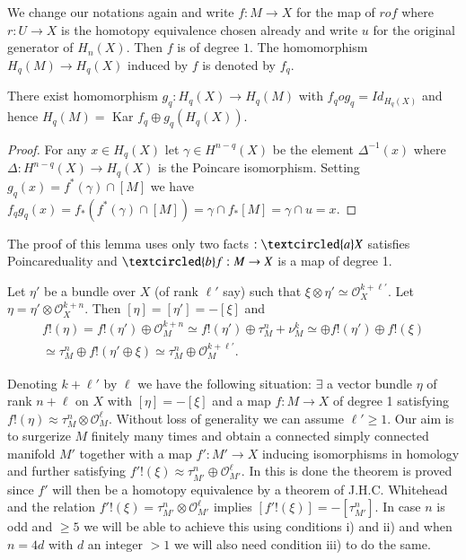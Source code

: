 We change our notations again and write $f : M \to X$ for the map of
$rof$ where $r : U \to X$ is the homotopy equivalence chosen already and
write $u$ for the original generator of $H_n (X)$. Then $f$ is of
degree $1$. The homomorphism $H_q (M) \to H_q (X)$ induced by $f$ is
denoted by $f_q$. 

\begin{lemma}\label{chap1:lem2.5}%
There exist homomorphism $g_q : H_q (X) \to H_q (M)$ with $f_q o g_q =
Id_{H_q(X)}$ and hence $H_q (M)= $ Kar $f_q \oplus g_q (H_q (X))$.  
\end{lemma}

\begin{proof}
For any $x \in H_q (X)$ let $\gamma \in H^{n-q} (X)$ be the
element $\Delta^{-1} (x)$ where $\Delta : H^{n-q} (X) \to H_q (X)$ is
the Poincare isomorphism. Setting $g_q (x) = f^* (\gamma) \cap [M]$
we have $f_q g_q (x) = f_* (f^* (\gamma) \cap [M]) = \gamma \cap f_*
[M] = \gamma \cap u = x$.  
\end{proof}

The proof of this lemma uses only two facts $: \textcircled{a} X$
satisfies Poincare\pageoriginale duality and $\textcircled{b} f : M
\rightarrow X $ is a map of degree 1.   

Let $\eta'$ be a bundle over $X$ (of rank $\ell'$ say) such that $\xi
\otimes \eta' \simeq \mathscr{O}^{k + \ell'}_X$. Let $\eta = \eta' \otimes
\mathscr{O}_X^{k + n}$. Then $ [\eta] = [\eta'] = - [\xi]$ and  
\begin{gather*}
f!(\eta) = f! (\eta') \oplus \mathscr{O}^{k+n}_M \simeq f! (\eta') \oplus
\tau^{n}_M + \nu^k_M \simeq \oplus f! (\eta') \oplus f! (\xi)\\
 \simeq\tau^{n}_M \oplus f!  (\eta' \oplus \xi ) \simeq \tau^{n}_M
 \oplus \mathscr{O}^{k+\ell'}_M.  
\end{gather*}

Denoting $k+ \ell'$ by $\ell$ we have the following situation: 
 $\exists$ a vector bundle $\eta$ of rank $n + \ell$ on $X$ with
$[\eta] = - [\xi]$ and a map $f:M \to X$ of degree 1 satisfying $f!
(\eta) \approx \tau^n_M \otimes \mathscr{O}^\ell_M$. Without loss of
generality we can assume $\ell' \geq 1$. Our aim is to surgerize $M$
finitely many times and obtain a connected simply connected manifold
$M'$ together with a map $f' : M' \to X$ inducing isomorphisms in
homology and further satisfying $f'! (\xi)\approx \tau^{n}_{M'} \oplus
\mathscr{O}^\ell_{M'}$. In this is done the theorem is proved since $f'$
will then be a homotopy equivalence by a theorem of J.H.C. Whitehead
and the relation $f' !(\xi) = \tau^n_{M'} \otimes \mathscr{O}^\ell_{M'}$ implies
$[f' !(\xi)] = - [\tau^n_{M'}]$. In case $n$ is odd and $\geq 5$ we will be
able to achieve this using conditions i) and ii) and when $n = 4d$
with $d$ an integer $> 1$ we will also need condition iii) to do the
same.  

